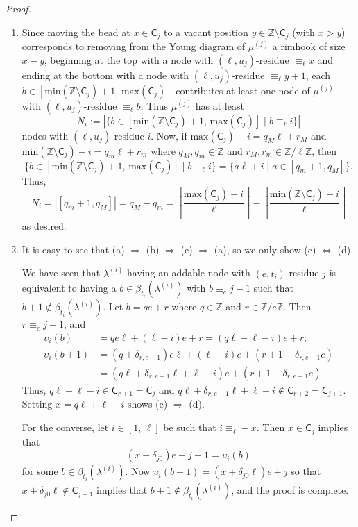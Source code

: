 \documentclass[11pt,a4paper,reqno]{amsart}
\numberwithin{equation}{section}
\theoremstyle{plain}
\theoremstyle{definition}
\theoremstyle{remark}
\numberwithin{equation}{section}
\newcommand{\uu}{\upsilon}
\renewcommand{\min}{\mathrm{min}}
\renewcommand{\max}{\mathrm{max}}
\newcommand{\ZZ}{\mathbb{Z}}
\newcommand{\C}{\mathsf{C}}
\begin{document}
\begin{proof} \hfill
\begin{enumerate}
\item Since moving the bead at $x \in \C_j$ to a vacant position $y \in \ZZ \setminus \C_j$ (with $x > y$) corresponds to removing from the Young diagram of $\mu^{(j)}$ a rimhook of size $x-y$, beginning at the top with a node with $(\ell,u_j)$-residue $\equiv_{\ell} x$ and ending at the bottom with a node with $(\ell,u_j)$-residue $\equiv_{\ell} y + 1$, each $b \in [\min(\ZZ \setminus \C_j)+1,\, \max(\C_j)]$ contributes at least one node of $\mu^{(j)}$ with $(\ell,u_j)$-residue $\equiv_{\ell} b$.
Thus $\mu^{(j)}$ has at least
$$
N_i := |\{ b \in [\min(\ZZ \setminus \C_j)+1,\, \max(\C_j)] \mid b \equiv_{\ell} i \}|
$$
nodes with $(\ell,u_j)$-residue $i$.
Now, if $\max(\C_j) - i = q_M \ell + r_M$ and $\min(\ZZ \setminus \C_j) -i = q_m \ell + r_m$ where $q_M,q_m \in \ZZ$ and $r_M, r_m \in \ZZ/\ell\ZZ$, then
$$
\{ b \in [\min(\ZZ \setminus \C_j)+1,\, \max(\C_j)] \mid b \equiv_{\ell} i \}
= \{ a \ell + i \mid a \in [q_m+1,q_M] \}.
$$
Thus,
$$
N_i = |[q_m + 1, q_M]| = q_M - q_m = \left\lfloor \frac{\max(\C_j) -i}{\ell} \right\rfloor  - \left\lfloor \frac{\min(\ZZ \setminus \C_j) -i}{\ell} \right\rfloor
$$
as desired.

\item 
It is easy to see that (a) $\Rightarrow$ (b) $\Rightarrow$ (c) $\Rightarrow$ (a), so we only show (c) $\Leftrightarrow$ (d).

We have seen that $\lambda^{(i)}$ having an addable node with $(e,t_i)$-residue $j$ is equivalent to having a $b \in \beta_{t_i}(\lambda^{(i)})$ with $b \equiv_e j-1$ such that $b+1 \notin \beta_{t_i}(\lambda^{(i)})$.
Let $b = qe + r$ where $q \in \ZZ$ and $r \in \ZZ/e\ZZ$.
Then $r \equiv_e j-1$, and 
\begin{align*}
\uu_i(b) &= qe\ell + (\ell -i)e + r = (q\ell + \ell -i)e + r ; \\
\uu_i(b+1) &= (q+\delta_{r,e-1})e\ell + (\ell-i)e + (r+1 - \delta_{r,e-1}e) \\
&= (q\ell  + \delta_{r,e-1}\ell + \ell-i) e + (r+1 - \delta_{r,e-1}e).
\end{align*}
Thus, $q\ell + \ell -i \in \C_{r+1} = \C_j$ and $q\ell  + \delta_{r,e-1}\ell + \ell-i \notin \C_{r+2} = \C_{j+1}$. Setting $x = q\ell + \ell -i$ shows (c) $\Rightarrow$ (d).  

For the converse, let $i \in [1,\, \ell]$ be such that $i\equiv_{\ell} -x$. 
Then $x \in \C_j$ implies that $$(x+\delta_{j0})e+j-1 = \uu_i(b)$$ for some $b \in \beta_{t_i}(\lambda^{(i)})$.  Now $\uu_i(b+1) = (x+\delta_{j0}\ell)e+j$  so that $x+\delta_{j0}\ell \notin \C_{j+1}$ implies that $b+1 \notin \beta_{t_i}(\lambda^{(i)})$, and the proof is complete.
\end{enumerate}
\end{proof}
\end{document}
